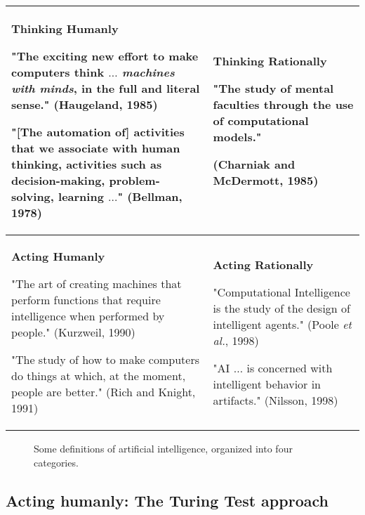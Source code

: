 \documentclass[a4paper,10pt,twoside]{book}
\begin{document}
\begin{table}[htbp]
    \begin{tabular}{|p{}|p{}|}
        \hline
        \textbf{Thinking Humanly}

        "The exciting new effort to make computers think $\ldots$ \textit{machines with minds}, in the full and literal sense." (Haugeland, 1985)

        "[The automation of] activities that we associate with human thinking, activities such as decision-making, problem-solving, learning $\ldots$" (Bellman, 1978)
        &
        \textbf{Thinking Rationally}

        "The study of mental faculties through the use of computational models."

        (Charniak and McDermott, 1985)
        \\ \hline
        \textbf{Acting Humanly}

        "The art of creating machines that perform functions that require intelligence when performed by people." (Kurzweil, 1990)

        "The study of how to make computers do things at which, at the moment, people are better." (Rich and Knight, 1991)
        &
        \textbf{Acting Rationally}

        "Computational Intelligence is the study of the design of intelligent agents." (Poole \textit{et al.}, 1998)

        "AI $\ldots$ is concerned with intelligent behavior in artifacts." (Nilsson, 1998)
        \\ \hline
    \end{tabular}
\end{table}
\begin{figure}[htbp]
    \caption{Some definitions of artificial intelligence, organized into four categories.}
    \label{Figure:1.1}
\end{figure}

\subsection{Acting humanly: The Turing Test approach}
\end{document}
